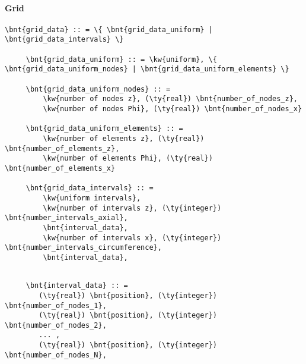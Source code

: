 \paragraph{Grid}
\begin{Verbatim}[commandchars=\\\{\}]
     \bnt{grid_data} :: = \{ \bnt{grid_data_uniform} | \bnt{grid_data_intervals} \}

     \bnt{grid_data_uniform} :: = \kw{uniform}, \{ \bnt{grid_data_uniform_nodes} | \bnt{grid_data_uniform_elements} \}

     \bnt{grid_data_uniform_nodes} :: =
         \kw{number of nodes z}, (\ty{real}) \bnt{number_of_nodes_z},
         \kw{number of nodes Phi}, (\ty{real}) \bnt{number_of_nodes_x}

     \bnt{grid_data_uniform_elements} :: =
         \kw{number of elements z}, (\ty{real}) \bnt{number_of_elements_z},
         \kw{number of elements Phi}, (\ty{real}) \bnt{number_of_elements_x}

     \bnt{grid_data_intervals} :: =
         \kw{uniform intervals},
         \kw{number of intervals z}, (\ty{integer}) \bnt{number_intervals_axial},
         \bnt{interval_data},
         \kw{number of intervals x}, (\ty{integer}) \bnt{number_intervals_circumference},
         \bnt{interval_data},
\end{Verbatim}
\begin{Verbatim}[commandchars=\\\{\}]

     \bnt{interval_data} :: =
        (\ty{real}) \bnt{position}, (\ty{integer}) \bnt{number_of_nodes_1},
        (\ty{real}) \bnt{position}, (\ty{integer}) \bnt{number_of_nodes_2},
        ... ,
        (\ty{real}) \bnt{position}, (\ty{integer}) \bnt{number_of_nodes_N},

\end{Verbatim}
